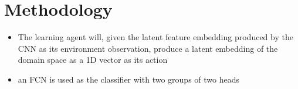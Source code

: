 \chapter{Methodology}\label{chapter:methodology}

\begin{itemize}
	\item The learning agent will, given the latent feature embedding produced by the CNN as its environment observation, produce a latent embedding of the domain space as a 1D vector as its action
	\item an FCN is used as the classifier with two groups of two heads
\end{itemize}